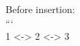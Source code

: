\documentclass[preview]{standalone}
\begin{document}
Before insertion:\\```\\1 <-> 2 <-> 3\\
\end{document}
